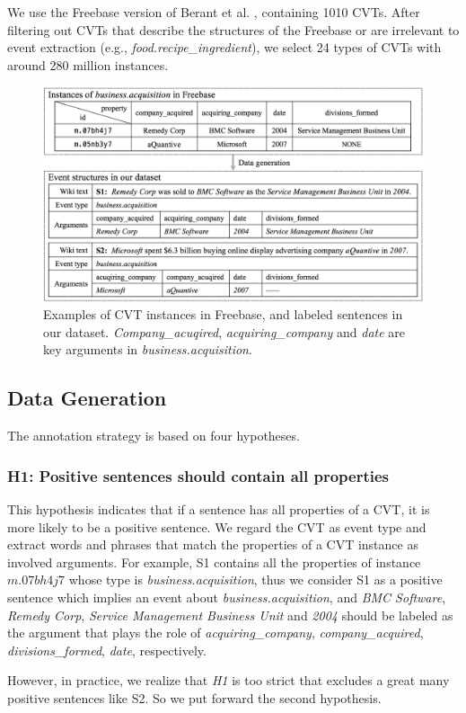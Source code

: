 We use the Freebase version of Berant et al. , containing 1010 CVTs. After filtering out CVTs that describe the structures of the Freebase or are irrelevant to event extraction (e.g., \emph{food.recipe\_ingredient}), we select 24 types of CVTs with around 280 million instances.

\begin{figure}[h]
	\centering
	\includegraphics[width=.48\textwidth]{temp}
	\caption{Examples of CVT instances in Freebase, and labeled sentences in our dataset. \emph{Company\_acuqired}, \emph{acquiring\_company} and \emph{date} are key arguments in \emph{business.acquisition}. \label{fig:3}}
\end{figure}

\subsection{Data Generation\label{datagen}}
The annotation strategy is based on four hypotheses.

\subsubsection{H1: Positive sentences should contain all properties}
This hypothesis indicates that if a sentence has all properties of a CVT, it is more likely to be a positive sentence. We regard the CVT as event type and extract words and phrases that match the properties of a CVT instance as involved arguments. For example, S1 contains all the properties of instance $m.07bh4j7$ whose type is \emph{business.acquisition}, thus we consider S1 as a positive sentence which implies an event about \emph{business.acquisition}, and \emph{BMC Software}, \emph{Remedy Corp}, \emph{Service Management Business Unit} and \emph{2004} should be labeled as the argument that plays the role of \emph{acquiring\_company}, \emph{company\_acquired}, \emph{divisions\_formed}, \emph{date}, respectively.

However, in practice, we realize that \emph{H1} is too strict that excludes a great many positive sentences like S2. So we put forward the second hypothesis.

